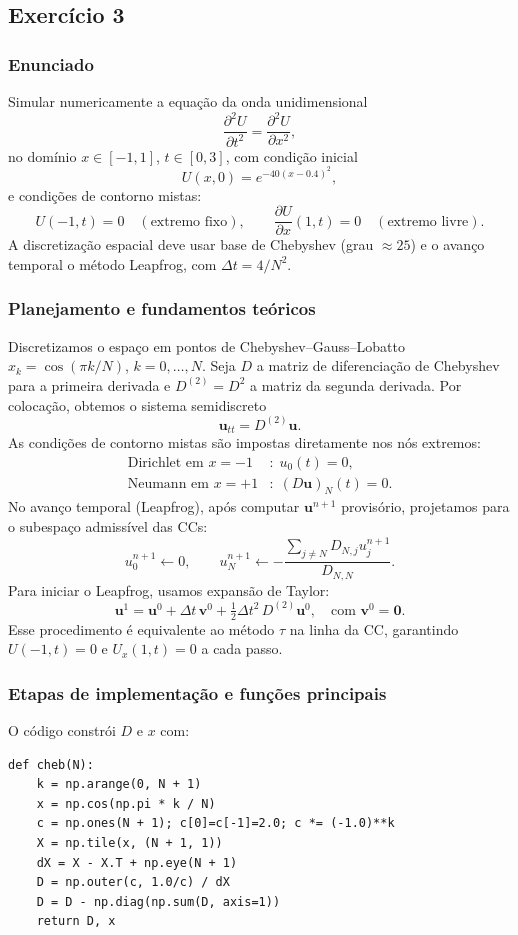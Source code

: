 \documentclass[12pt,a4paper]{article}
\begin{document}
\newpage

\subsection{Exercício 3}

\subsubsection{Enunciado}
Simular numericamente a equação da onda unidimensional
\[
\frac{\partial^2 U}{\partial t^2} = \frac{\partial^2 U}{\partial x^2},
\]
no domínio \(x\in[-1,1]\), \(t\in[0,3]\), com condição inicial
\[
U(x,0)=e^{-40(x-0.4)^2},
\]
e condições de contorno mistas:
\[
U(-1,t)=0 \quad (\text{extremo fixo}),\qquad
\frac{\partial U}{\partial x}(1,t)=0 \quad (\text{extremo livre}).
\]
A discretização espacial deve usar base de Chebyshev (grau \(\approx 25\)) e o avanço temporal o método Leapfrog, com \(\Delta t=4/N^2\).

\subsubsection{Planejamento e fundamentos teóricos}
Discretizamos o espaço em pontos de Chebyshev–Gauss–Lobatto \(x_k=\cos(\pi k/N)\), \(k=0,\ldots,N\).
Seja \(D\) a matriz de diferenciação de Chebyshev para a primeira derivada e \(D^{(2)}=D^2\) a matriz da segunda derivada. Por colocação, obtemos o sistema semidiscreto
\[
\mathbf{u}_{tt} = D^{(2)} \mathbf{u}.
\]
As condições de contorno mistas são impostas diretamente nos nós extremos:
\begin{align*}
\text{Dirichlet em } x=-1 &: \; u_0(t)=0,\\
\text{Neumann em } x=+1 &: \; (D\mathbf{u})_{N}(t)=0.
\end{align*}
No avanço temporal (Leapfrog), após computar \(\mathbf{u}^{n+1}\) provisório, projetamos para o subespaço admissível das CCs:
\[
u^{n+1}_0 \leftarrow 0,\qquad
u^{n+1}_N \leftarrow -\frac{\sum_{j\neq N} D_{N,j} u^{n+1}_j}{D_{N,N}}.
\]
Para iniciar o Leapfrog, usamos expansão de Taylor:
\[
\mathbf{u}^{1}=\mathbf{u}^{0} + \Delta t\,\mathbf{v}^{0} + \tfrac{1}{2}\Delta t^2\,D^{(2)}\mathbf{u}^{0},
\quad \text{com } \mathbf{v}^0=\mathbf{0}.
\]
Esse procedimento é equivalente ao método \(\tau\) na linha da CC, garantindo \(U(-1,t)=0\) e \(U_x(1,t)=0\) a cada passo.

\subsubsection{Etapas de implementação e funções principais}
O código constrói \(D\) e \(x\) com:
\begin{verbatim}
def cheb(N):
    k = np.arange(0, N + 1)
    x = np.cos(np.pi * k / N)
    c = np.ones(N + 1); c[0]=c[-1]=2.0; c *= (-1.0)**k
    X = np.tile(x, (N + 1, 1))
    dX = X - X.T + np.eye(N + 1)
    D = np.outer(c, 1.0/c) / dX
    D = D - np.diag(np.sum(D, axis=1))
    return D, x
\end{verbatim}
\end{document}
